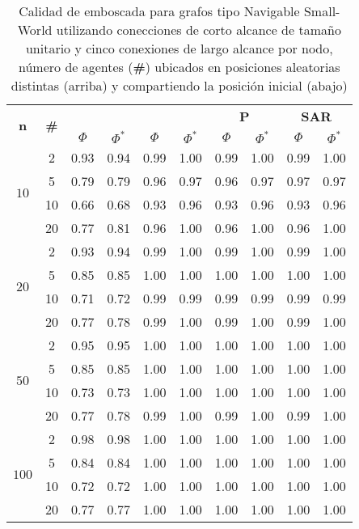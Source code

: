 \begin{table}
	\caption{Calidad de emboscada para grafos tipo Navigable Small-World 
	utilizando conecciones de corto alcance de tamaño unitario y cinco conexiones
	de largo alcance por nodo, n\'umero de agentes (\textbf{\#}) ubicados en
	posiciones aleatorias distintas (arriba) y compartiendo la posici\'on
	inicial (abajo)}
	\label{tab:ambush_nswg}
	\centering
	\begin{small}
		\setlength{\tabcolsep}{4pt}
		\begin{tabular}{|c|c|cc|cc|cc|cc|}
			\hline
			\multirow{2}{*}{\textbf{n}} &
			\multirow{2}{*}{\textbf{\#}} &
			\multicolumn{2}{c|}{\textbf{\astar}} &
			\multicolumn{2}{c|}{\textbf{\ambush}} &
			\multicolumn{2}{c|}{\textbf{P}} &
			\multicolumn{2}{c|}{\textbf{SAR}}\\
			& & $\Phi$ & $\Phi^*$ & $\Phi$ & $\Phi^*$&
			$\Phi$ & $\Phi^*$& $\Phi$ & $\Phi^*$\\
			\hline
			\multirow{4}{*}{$10$}
			 & 2 & 0.93 & 0.94 & 0.99 & 1.00 & 0.99 & 1.00 & 0.99 & 1.00\\
			 & 5 & 0.79 & 0.79 & 0.96 & 0.97 & 0.96 & 0.97 & 0.97 & 0.97\\
			 & 10 & 0.66 & 0.68 & 0.93 & 0.96 & 0.93 & 0.96 & 0.93 & 0.96\\
			 & 20 & 0.77 & 0.81 & 0.96 & 1.00 & 0.96 & 1.00 & 0.96 & 1.00\\
			\hline
			\multirow{4}{*}{$20$}
			 & 2 & 0.93 & 0.94 & 0.99 & 1.00 & 0.99 & 1.00 & 0.99 & 1.00\\
			 & 5 & 0.85 & 0.85 & 1.00 & 1.00 & 1.00 & 1.00 & 1.00 & 1.00\\
			 & 10 & 0.71 & 0.72 & 0.99 & 0.99 & 0.99 & 0.99 & 0.99 & 0.99\\
			 & 20 & 0.77 & 0.78 & 0.99 & 1.00 & 0.99 & 1.00 & 0.99 & 1.00\\
			 \hline
			\multirow{4}{*}{$50$}
			 & 2 & 0.95 & 0.95 & 1.00 & 1.00 & 1.00 & 1.00 & 1.00 & 1.00\\
			 & 5 & 0.85 & 0.85 & 1.00 & 1.00 & 1.00 & 1.00 & 1.00 & 1.00\\
			 & 10 & 0.73 & 0.73 & 1.00 & 1.00 & 1.00 & 1.00 & 1.00 & 1.00\\
			 & 20 & 0.77 & 0.78 & 0.99 & 1.00 & 0.99 & 1.00 & 0.99 & 1.00\\
			 \hline
			\multirow{4}{*}{$100$}
			 & 2 & 0.98 & 0.98 & 1.00 & 1.00 & 1.00 & 1.00 & 1.00 & 1.00\\
			 & 5 & 0.84 & 0.84 & 1.00 & 1.00 & 1.00 & 1.00 & 1.00 & 1.00\\
			 & 10 & 0.72 & 0.72 & 1.00 & 1.00 & 1.00 & 1.00 & 1.00 & 1.00\\
			 & 20 & 0.77 & 0.77 & 1.00 & 1.00 & 1.00 & 1.00 & 1.00 & 1.00\\
			 \hline
		\end{tabular}
		

\end{small}
\end{table}
